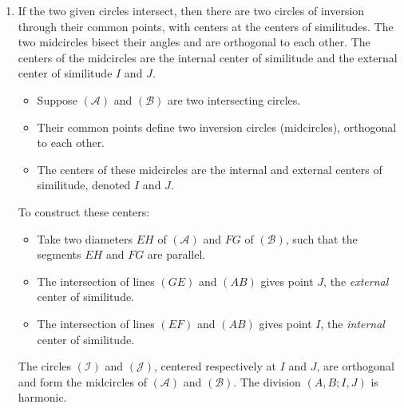 \begin{enumerate}[label=(\roman*)]
\item If the two given circles intersect, then there are two  circles of inversion through their common points, with centers at the centers of similitudes.  The two midcircles bisect their angles and are orthogonal to each other. The centers of the midcircles are the internal center of similitude and the external center of similitude $I$ and $J$.

\begin{itemize}
  \item Suppose $(\mathcal{A})$ and $(\mathcal{B})$ are two intersecting circles.
  \item Their common points define two inversion circles (midcircles), orthogonal to each other.
  \item The centers of these midcircles are the internal and external centers of similitude, denoted $I$ and $J$.
\end{itemize}

\noindent
To construct these centers:
\begin{itemize}
  \item Take two diameters $EH$ of $(\mathcal{A})$ and $FG$ of $(\mathcal{B})$, such that the segments $EH$ and $FG$ are parallel.
  \item The intersection of lines $(GE)$ and $(AB)$ gives point $J$, the \emph{external} center of similitude.
  \item The intersection of lines $(EF)$ and $(AB)$ gives point $I$, the \emph{internal} center of similitude.
\end{itemize}

\noindent
The circles $(\mathcal{I})$ and $(\mathcal{J})$, centered respectively at $I$ and $J$, are orthogonal and form the midcircles of $(\mathcal{A})$ and $(\mathcal{B})$. The division $(A,B;I,J)$ is harmonic.

\vspace{1em}


\end{enumerate}
